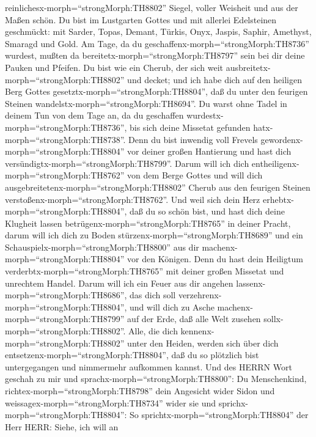 reinlichesx-morph=``strongMorph:TH8802'' Siegel, voller Weisheit und aus
der Maßen schön.  Du bist im Lustgarten Gottes und mit
allerlei Edelsteinen geschmückt: mit Sarder, Topas, Demant, Türkis,
Onyx, Jaspis, Saphir, Amethyst, Smaragd und Gold. Am Tage, da du
geschaffenx-morph=``strongMorph:TH8736'' wurdest, mußten da
bereitetx-morph=``strongMorph:TH8797'' sein bei dir deine Pauken und
Pfeifen.  Du bist wie ein Cherub, der sich weit
ausbreitetx-morph=``strongMorph:TH8802'' und decket; und ich habe dich
auf den heiligen Berg Gottes gesetztx-morph=``strongMorph:TH8804'', daß
du unter den feurigen Steinen wandelstx-morph=``strongMorph:TH8694''.
 Du warst ohne Tadel in deinem Tun von dem Tage an, da du
geschaffen wurdestx-morph=``strongMorph:TH8736'', bis sich deine
Missetat gefunden hatx-morph=``strongMorph:TH8738''.  Denn
du bist inwendig voll Frevels gewordenx-morph=``strongMorph:TH8804'' vor
deiner großen Hantierung und hast dich
versündigtx-morph=``strongMorph:TH8799''. Darum will ich dich
entheiligenx-morph=``strongMorph:TH8762'' von dem Berge Gottes und will
dich ausgebreitetenx-morph=``strongMorph:TH8802'' Cherub aus den
feurigen Steinen verstoßenx-morph=``strongMorph:TH8762''. 
Und weil sich dein Herz erhebtx-morph=``strongMorph:TH8804'', daß du so
schön bist, und hast dich deine Klugheit lassen
betrügenx-morph=``strongMorph:TH8765'' in deiner Pracht, darum will ich
dich zu Boden stürzenx-morph=``strongMorph:TH8689'' und ein
Schauspielx-morph=``strongMorph:TH8800'' aus dir
machenx-morph=``strongMorph:TH8804'' vor den Königen.  Denn
du hast dein Heiligtum verderbtx-morph=``strongMorph:TH8765'' mit deiner
großen Missetat und unrechtem Handel. Darum will ich ein Feuer aus dir
angehen lassenx-morph=``strongMorph:TH8686'', das dich soll
verzehrenx-morph=``strongMorph:TH8804'', und will dich zu Asche
machenx-morph=``strongMorph:TH8799'' auf der Erde, daß alle Welt zusehen
sollx-morph=``strongMorph:TH8802''.  Alle, die dich
kennenx-morph=``strongMorph:TH8802'' unter den Heiden, werden sich über
dich entsetzenx-morph=``strongMorph:TH8804'', daß du so plötzlich bist
untergegangen und nimmermehr aufkommen kannst.  Und des
HERRN Wort geschah zu mir und sprachx-morph=``strongMorph:TH8800'':
 Du Menschenkind, richtex-morph=``strongMorph:TH8798'' dein
Angesicht wider Sidon und weissagex-morph=``strongMorph:TH8734'' wider
sie  und sprichx-morph=``strongMorph:TH8804'': So
sprichtx-morph=``strongMorph:TH8804'' der Herr HERR: Siehe, ich will an
